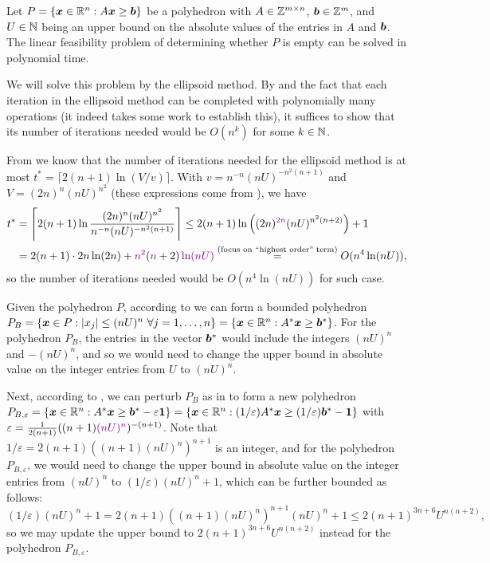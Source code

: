 \begin{enumerate}
\begin{theorem}
\label{thm:feas-prob-poly-time}
Let \(P=\{\bm{x}\in\mathbb{R}^n:A\bm{x}\ge\bm{b}\}\) be a polyhedron with
\(A\in\mathbb{Z}^{m\times n}\), \(\bm{b}\in \mathbb{Z}^{m}\), and \(U\in\mathbb{N}\) being an upper
bound on the absolute values of the entries in \(A\) and \(\bm{b}\). The
linear feasibility problem of determining whether \(P\) is empty can be solved
in polynomial time.
\end{theorem}
\begin{pf}
We will solve this problem by the ellipsoid method.  By
 and the fact that each iteration in the
ellipsoid method can be completed with polynomially many operations (it indeed
takes some work to establish this), it suffices to show that its number of
iterations needed would be \(O(n^k)\) for some \(k\in\mathbb{N}\).
\end{pf}

From  we know that the number of
iterations needed for the ellipsoid method is at most \(t^{*}=\lceil 2(n+1)\ln
(V/v)\rceil\). With \(v=n^{-n}(nU)^{-n^{2}(n+1)}\) and \(V=(2n)^{n}(nU)^{n^{2}}\)
(these expressions come from
), we have
\begin{align*}
t^{*}&=\left\lceil 2(n+1)\ln \frac{(2n)^{n}(nU)^{n^{2}}}{n^{-n}(nU)^{-n^{2}(n+1)}}\right\rceil
\le 2(n+1)\ln\left((2n)^{\vc{2n}}(nU)^{n^{2}(n+2)}\right)+1 \\
&= 2(n+1)\cdot 2n\ln (2n)+\vc{n^{2}}(\vc{n}+2)\vc{\ln (nU)}
\overset{\text{(focus on ``highest order'' term)}}{=}O(n^{4}\ln (nU)),
\end{align*}
so the number of iterations needed would be \(O(n^{4}\ln (nU))\) for such case.

Given the polyhedron \(P\), according to  we can
form a bounded polyhedron \(P_{B}=\{\bm{x}\in P:|x_j|\le (nU)^{n}~\forall
j=1,\dotsc,n\}=\{\bm{x}\in\mathbb{R}^n: A^*\bm{x}\ge\bm{b}^*\}\). For the
polyhedron \(P_{B}\), the entries in the vector \(\bm{b}^*\) would include
the integers \((nU)^{n}\) and \(-(nU)^{n}\), and so we would need to change the
upper bound in absolute value on the integer entries from \(U\) to
\((nU)^{n}\).

Next, according to , we can perturb \(P_{B}\)
as in  to form a new polyhedron
\(P_{B,\varepsilon}=\{\bm{x}\in\mathbb{R}^n:A^{*}\bm{x}\ge\bm{b}^{*}-\varepsilon\bm{1}\}
=\{\bm{x}\in\mathbb{R}^n:(1/\varepsilon)A^{*}\bm{x}\ge (1/\varepsilon)\bm{b}^{*}-\bm{1}\}\) with
\(\varepsilon=\frac{1}{2(n+1)}((n+1)\vc{(nU)^{n}})^{-(n+1)}\). Note that \(1/\varepsilon
=2(n+1)((n+1)(nU)^{n})^{n+1}\) is an integer,
and for the polyhedron \(P_{B,\varepsilon}\), we would need to change the upper
bound in absolute value on the integer entries from \((nU)^{n}\) to
\((1/\varepsilon)(nU)^{n}+1\), which can be further bounded as follows:
\[(1/\varepsilon)(nU)^{n}+1
=2(n+1)((n+1)(nU)^{n})^{n+1}(nU)^{n}+1
\le 2(n+1)^{3n+6}U^{n(n+2)},
\]
so we may update the upper bound to \(2(n+1)^{3n+6}U^{n(n+2)}\) instead for the
polyhedron \(P_{B,\varepsilon}\).


\end{enumerate}
